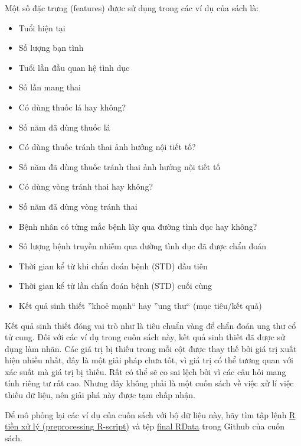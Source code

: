 Một số đặc trưng (features) được sử dụng trong các ví dụ của sách là: 
\begin{itemize} 
    \item Tuổi hiện tại
    \item Số lượng bạn tình
    \item Tuổi lần đầu quan hệ tình dục
    \item Số lần mang thai
    \item Có dùng thuốc lá hay không?
    \item Số năm đã dùng thuốc lá
    \item Có dùng thuốc tránh thai ảnh hưởng nội tiết tố?
    \item Số năm đã dùng thuốc tránh thai ảnh hưởng nội tiết tố
    \item Có dùng vòng tránh thai hay không?
    \item Số năm đã dùng vòng tránh thai
    \item Bệnh nhân có từng mắc bệnh lây qua đường tình dục hay không?
    \item Số lượng bệnh truyền nhiễm qua đường tình dục đã được chẩn đoán
    \item Thời gian kể từ khi chẩn đoán bệnh (STD) đầu tiên
    \item Thời gian kể từ lần chẩn đoán bệnh (STD) cuối cùng
    \item Kết quả sinh thiết ''khoẻ mạnh`` hay ''ung thư`` (mục tiêu/kết quả)
\end{itemize}

Kết quả sinh thiết đóng vai trò như là tiêu chuẩn vàng để chẩn đoán ung thư cổ tử cung. Đối với các ví dụ trong cuốn sách này, kết quả sinh thiết đã được sử dụng làm nhãn. Các giá trị bị thiếu trong mỗi cột được thay thế bởi giá trị xuất hiện nhiều nhất, đây là một giải pháp chưa tốt, vì giá trị có thể tương quan với xác suất mà giá trị bị thiếu. Rất có thể sẽ co sai lệch bởi vì các câu hỏi mang tính riêng tư rất cao. Nhưng đây không phải là một cuốn sách về việc xử lí việc thiếu dữ liệu, nên giải phá  này được tạm chấp nhận.

Để mô phỏng lại các ví dụ của cuốn sách với bộ dữ liệu này, hãy tìm tập lệnh \href{https://github.com/christophM/interpretable-ml-book/blob/master/R/get-cervical-cancer-dataset.R}{R tiền xử lý (preprocessing R-script)}  và tệp \href{https://github.com/christophM/interpretable-ml-book/blob/master/data/cervical.RData}{final RData} trong Github của cuốn sách.
